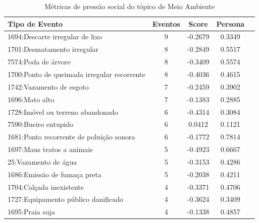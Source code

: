 \begin{table}[htbp]
	\centering
	\caption{Métricas de pressão social do tópico de Meio Ambiente}
	\label{tab:eventos_populares_environment}
	\begin{tabular}{|l|c|c|c|c|}
		\hline
		\textbf{Tipo de Evento}                     & \textbf{Eventos} & \textbf{Score} & \textbf{Persona} \\
		\hline
		1694:Descarte irregular de lixo             & 9                & -0.2679        & 0.3349           \\
		\hline
		1701:Desmatamento irregular                 & 8                & -0.2849        & 0.5517           \\
		\hline
		7574:Poda de árvore                         & 8                & -0.3409        & 0.5574           \\
		\hline
		1700:Ponto de queimada irregular recorrente & 8                & -0.4036        & 0.4615           \\
		\hline
		1742:Vazamento de esgoto                    & 7                & -0.2459        & 0.3902           \\
		\hline
		1696:Mato alto                              & 7                & -0.1383        & 0.2885           \\
		\hline
		1728:Imóvel ou terreno abandonado           & 6                & -0.4314        & 0.3084           \\
		\hline
		7590:Bueiro entupido                        & 6                & 0.0412         & 0.1121           \\
		\hline
		1681:Ponto recorrente de poluição sonora    & 6                & -0.1772        & 0.7814           \\
		\hline
		1697:Maus tratos a animais                  & 5                & -0.4923        & 0.6667           \\
		\hline
		25:Vazamento de água                        & 5                & -0.3153        & 0.4286           \\
		\hline
		1686:Emissão de fumaça preta                & 5                & -0.2038        & 0.4211           \\
		\hline
		1704:Calçada inexistente                    & 4                & -0.3371        & 0.4706           \\
		\hline
		1727:Equipamento público danificado         & 4                & -0.3624        & 0.3409           \\
		\hline
		1695:Praia suja                             & 4                & -0.1338        & 0.4857           \\

\end{tabular}
\end{table}
